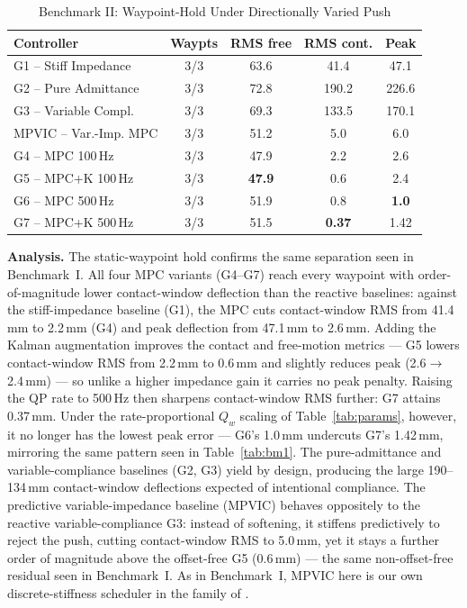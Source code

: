 \documentclass[journal]{IEEEtran}
\begin{document}
\begin{table}[!t]
\caption{Benchmark II: Waypoint-Hold Under Directionally Varied Push}
\label{tab:bm2}
\renewcommand{\arraystretch}{1.0}
\footnotesize
\setlength{\tabcolsep}{3pt}
\begin{tabular}{lcccc}
\toprule
\textbf{Controller} & \textbf{Waypts} & \textbf{RMS free} & \textbf{RMS cont.} & \textbf{Peak}\\
\midrule
G1 -- Stiff Impedance    & 3/3 & 63.6 & 41.4 & 47.1\\
G2 -- Pure Admittance    & 3/3 & 72.8 & 190.2 & 226.6\\
G3 -- Variable Compl.    & 3/3 & 69.3 & 133.5 & 170.1\\
MPVIC -- Var.-Imp. MPC   & 3/3 & 51.2 & 5.0 & 6.0\\
G4 -- MPC 100\,Hz        & 3/3 & 47.9 & 2.2 & 2.6\\
G5 -- MPC+K 100\,Hz      & 3/3 & \textbf{47.9} & 0.6 & 2.4\\
G6 -- MPC 500\,Hz        & 3/3 & 51.9 & 0.8 & \textbf{1.0}\\
G7 -- MPC+K 500\,Hz      & 3/3 & 51.5 & \textbf{0.37} & 1.42\\
\bottomrule
\end{tabular}
\end{table}

\textbf{Analysis.} The static-waypoint hold confirms the same separation
seen in Benchmark~I. All four MPC variants (G4--G7) reach every
waypoint with order-of-magnitude lower contact-window deflection than
the reactive baselines: against the stiff-impedance baseline (G1), the
MPC cuts contact-window RMS from 41.4\,mm to 2.2\,mm (G4) and peak
deflection from 47.1\,mm to 2.6\,mm. Adding the Kalman augmentation
improves the contact and free-motion metrics --- G5 lowers contact-window
RMS from 2.2\,mm to 0.6\,mm and slightly reduces peak (2.6$\to$2.4\,mm)
--- so unlike a higher impedance gain it carries no peak penalty. Raising
the QP rate to 500\,Hz then sharpens contact-window RMS further: G7
attains 0.37\,mm. Under the rate-proportional $Q_w$ scaling of
Table~\ref{tab:params}, however, it no longer has the lowest peak error
--- G6's 1.0\,mm undercuts G7's 1.42\,mm, mirroring the same pattern seen
in Table~\ref{tab:bm1}. The
pure-admittance and variable-compliance baselines (G2, G3) yield by
design, producing the large 190--134\,mm contact-window deflections
expected of intentional compliance. The predictive variable-impedance
baseline (MPVIC) behaves oppositely to the reactive variable-compliance
G3: instead of softening, it stiffens predictively to reject the push,
cutting contact-window RMS to 5.0\,mm, yet it stays a further order of
magnitude above the offset-free G5 (0.6\,mm) --- the same non-offset-free
residual seen in Benchmark~I. As in Benchmark~I, MPVIC here is our own
discrete-stiffness scheduler in the family of
\cite{liu2025model,roveda2019optimal}.
\end{document}

